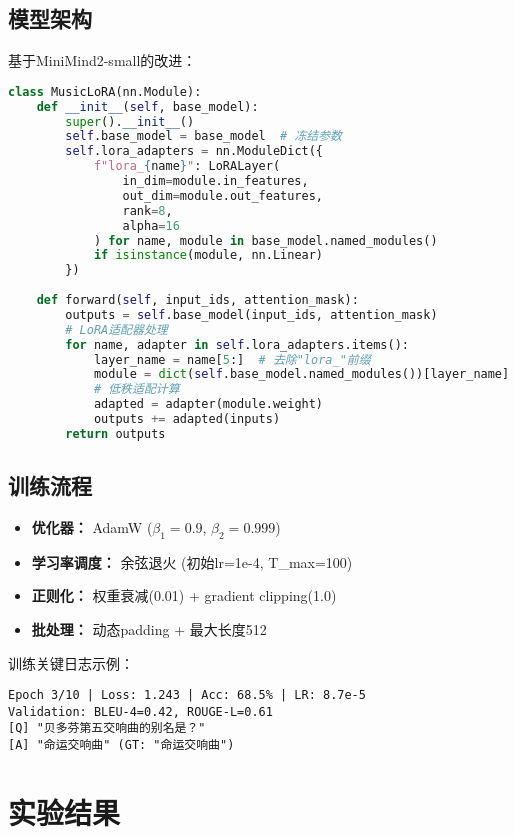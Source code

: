 \documentclass[a4paper,11pt]{article}
\begin{document}
\subsection{模型架构}
基于MiniMind2-small的改进：
\begin{lstlisting}[language=Python, caption=模型关键配置]
class MusicLoRA(nn.Module):
    def __init__(self, base_model):
        super().__init__()
        self.base_model = base_model  # 冻结参数
        self.lora_adapters = nn.ModuleDict({
            f"lora_{name}": LoRALayer(
                in_dim=module.in_features,
                out_dim=module.out_features,
                rank=8,
                alpha=16
            ) for name, module in base_model.named_modules()
            if isinstance(module, nn.Linear)
        })
        
    def forward(self, input_ids, attention_mask):
        outputs = self.base_model(input_ids, attention_mask)
        # LoRA适配器处理
        for name, adapter in self.lora_adapters.items():
            layer_name = name[5:]  # 去除"lora_"前缀
            module = dict(self.base_model.named_modules())[layer_name]
            # 低秩适配计算
            adapted = adapter(module.weight)
            outputs += adapted(inputs)
        return outputs
\end{lstlisting}

\subsection{训练流程}
\begin{itemize}
    \item \textbf{优化器：} AdamW ($\beta_1=0.9$, $\beta_2=0.999$)
    \item \textbf{学习率调度：} 余弦退火 (初始lr=1e-4, T_max=100)
    \item \textbf{正则化：} 权重衰减(0.01) + gradient clipping(1.0)
    \item \textbf{批处理：} 动态padding + 最大长度512
\end{itemize}

训练关键日志示例：
\begin{verbatim}
Epoch 3/10 | Loss: 1.243 | Acc: 68.5% | LR: 8.7e-5
Validation: BLEU-4=0.42, ROUGE-L=0.61
[Q] "贝多芬第五交响曲的别名是？" 
[A] "命运交响曲" (GT: "命运交响曲")
\end{verbatim}

\section{实验结果}
\end{document}
